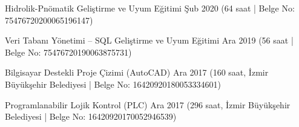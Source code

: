 \vspace{-3mm}

\begin{cventries}

  \cventry
    {Hidrolik-Pnömatik Geliştirme ve Uyum Eğitimi} %
    {} %
    {} %
    {Şub 2020} %
    {\scriptsize\color{lighttext}(64 saat | Belge No: 75476720200065196147)}

  \cventry
    {Veri Tabanı Yönetimi -- SQL Geliştirme ve Uyum Eğitimi} %
    {} %
    {} %
    {Ara 2019} %
    {\scriptsize\color{lighttext}(56 saat | Belge No: 75476720190063875731)}

\end{cventries}

\vspace{-3mm}

\begin{cventries}

  \cventry
    {Bilgisayar Destekli Proje Çizimi (AutoCAD)} %
    {} %
    {} %
    {Ara 2017} %
    {\scriptsize\color{lighttext}(160 saat, İzmir Büyükşehir Belediyesi | Belge No: 16420920180053334601)}

  \cventry
    {Programlanabilir Lojik Kontrol (PLC)} %
    {} %
    {} %
    {Ara 2017} %
    {\scriptsize\color{lighttext}(296 saat, İzmir Büyükşehir Belediyesi | Belge No: 16420920170052946539)}

\end{cventries}
